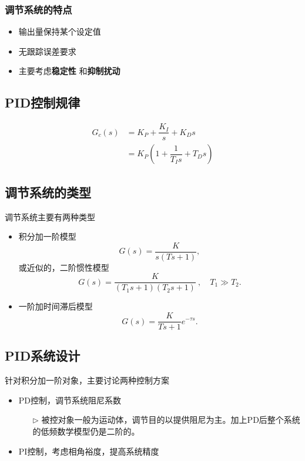\documentclass[14pt,a4paper]{article}
\theoremstyle{plain}
\theoremstyle{definition}
\theoremstyle{remark}
\theoremstyle{plain}
\theoremstyle{plain}
\theoremstyle{definition}
\begin{document}
		\subsubsection*{调节系统的特点}%
		\label{ssub:调节系统的特点}
		
		\begin{itemize}
			\item 输出量保持某个设定值
			\item 无跟踪误差要求
			\item 主要考虑\textbf{稳定性} 和\textbf{抑制扰动} 
		\end{itemize}  

		\subsection{PID控制规律}%
		\label{sub:pid控制规律}
		
			\begin{equation}
			\label{eq:pid}
			\begin{split}
				G_c(s) &= K_P + \dfrac{K_I}{s} + K_D s \\ 
					   &= K_P \left( 1+ \dfrac{1}{T_I s} + T_D s \right) 
			\end{split}
			\end{equation} 

		\subsection{调节系统的类型}%
		\label{sub:调节系统的类型}
	
		调节系统主要有两种类型
			\begin{itemize}
				\item 积分加一阶模型
					\[
						G(s) = \dfrac{K}{s(Ts+1)}
					,\] 
					或近似的，二阶惯性模型
					\[
						G(s) = \dfrac{K}{(T_1 s+ 1)(T_2 s + 1)} \ , \quad T_1 \gg T_2
					.\] 
				\item 一阶加时间滞后模型
					\[
						G(s) = \dfrac{K}{Ts+1} e^{-\tau s}
					.\] 
			\end{itemize} 

		\subsection{PID系统设计}%
		\label{sub:pid系统设计}
		
			针对积分加一阶对象，主要讨论两种控制方案
			\begin{itemize}
				\item PD控制，调节系统阻尼系数 
					\begin{itemize}
						\item[$\triangleright$] 被控对象一般为运动体，调节目的以提供阻尼为主。加上PD后整个系统的低频数学模型仍是二阶的。
					\end{itemize}  
				\item PI控制，考虑相角裕度，提高系统精度
			\end{itemize}  
\end{document}

